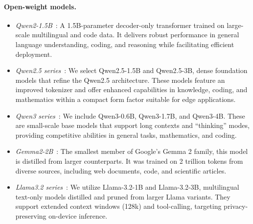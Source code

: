 \paragraph{Open-weight models.}
\begin{itemize}
    \item \textit{Qwen2-1.5B}~\cite{qwen2}: A 1.5B-parameter decoder-only transformer trained on large-scale multilingual and code data. It delivers robust performance in general language understanding, coding, and reasoning while facilitating efficient deployment.
    \item \textit{Qwen2.5 series}~\cite{qwen2025qwen25technicalreport}: We select Qwen2.5-1.5B and Qwen2.5-3B, dense foundation models that refine the Qwen2.5 architecture. These models feature an improved tokenizer and offer enhanced capabilities in knowledge, coding, and mathematics within a compact form factor suitable for edge applications.
    \item \textit{Qwen3 series}~\cite{qwen3}: We include Qwen3-0.6B, Qwen3-1.7B, and Qwen3-4B. These are small-scale base models that support long contexts and ``thinking'' modes, providing competitive abilities in general tasks, mathematics, and coding.
    \item \textit{Gemma2-2B}~\cite{morgane2024gemma2}: The smallest member of Google's Gemma 2 family, this model is distilled from larger counterparts. It was trained on 2 trillion tokens from diverse sources, including web documents, code, and scientific articles.
    \item \textit{Llama3.2 series}~\cite{llama3.2}: We utilize Llama-3.2-1B and Llama-3.2-3B, multilingual text-only models distilled and pruned from larger Llama variants. They support extended context windows (128k) and tool-calling, targeting privacy-preserving on-device inference.
\end{itemize}

